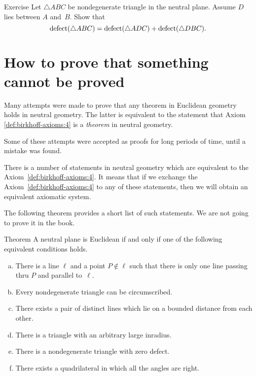 \begin{thm}{Exercise}\label{ex:defect}
Let $\triangle ABC$ be nondegenerate triangle in the neutral plane.
Assume $D$ lies between $A$ and~$B$.
Show that 
$$\mathop{\rm defect}\nolimits(\triangle ABC)=\mathop{\rm defect}\nolimits(\triangle ADC)+\mathop{\rm defect}\nolimits(\triangle DBC).$$

\end{thm}



\section*{How to prove that something\\ 
cannot be proved}

Many attempts were made to prove that any theorem in Euclidean geometry holds in neutral geometry.
The latter is equivalent to the statement that Axiom \ref{def:birkhoff-axioms:4} is a {}\emph{theorem} in neutral geometry.

Some of these attempts were accepted as proofs for long periods of time, until a mistake was found.

There is a number of statements in neutral geometry which are equivalent to the Axiom~\ref{def:birkhoff-axioms:4}.
It means that if we exchange the Axiom~\ref{def:birkhoff-axioms:4}  to any of these statements, then we will obtain an equivalent axiomatic system.

The following theorem provides a short list of such statements.
We are not going to prove it in the book.

\begin{thm}{Theorem}\label{thm:=IV}
A neutral plane is Euclidean if and only if one of the following equivalent conditions holds.
\begin{enumerate}[(a)]
\item\label{thm:=IV:main} 
There is a line $\ell$ 
and a point $P\notin\ell$ 
such that there is only one line passing thru $P$ 
and parallel to~$\ell$.
\item 
Every nondegenerate triangle can be circumscribed.
\item
There exists a pair of distinct lines which lie on a bounded distance from each other.
\item
There is a triangle with an arbitrary large inradius.
\item
There is a nondegenerate triangle with zero defect.
\item
There exists a quadrilateral in which all the angles are right.
\end{enumerate}
\end{thm}

